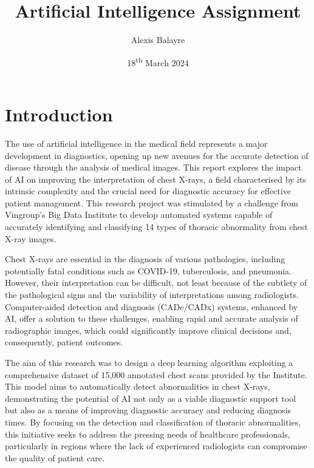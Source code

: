 \documentclass[12pt,oneside]{book} %
\title{Artificial Intelligence Assignment}
\author{Alexis Balayre}
\date{18\textsuperscript{th} March 2024}
\begin{document}
\frontmatter

\maketitle

{
    \clearpage
    \singlespacing
    {
        \tableofcontents
    }
    \clearpage

    \listoffigures

    \listoftables
}

\mainmatter
\pagestyle{fancy}
\fancyhead[L]{\nouppercase{\leftmark}}
\fancyhead[R]{\nouppercase{\rightmark}}

\chapter{Introduction}
The use of artificial intelligence in the medical field represents a major
development in diagnostics, opening up new avenues for the accurate detection
of disease through the analysis of medical images. This report explores the
impact of AI on improving the interpretation of chest X-rays, a field
characterised by its intrinsic complexity and the crucial need for diagnostic
accuracy for effective patient management. This research project was stimulated
by a challenge from Vingroup's Big Data Institute to develop automated systems
capable of accurately identifying and classifying 14 types of thoracic
abnormality from chest X-ray images.

Chest X-rays are essential in the diagnosis of various pathologies, including
potentially fatal conditions such as COVID-19, tuberculosis, and pneumonia.
However, their interpretation can be difficult, not least because of the
subtlety of the pathological signs and the variability of interpretations among
radiologists. Computer-aided detection and diagnosis (CADe/CADx) systems,
enhanced by AI, offer a solution to these challenges, enabling rapid and
accurate analysis of radiographic images, which could significantly improve
clinical decisions and, consequently, patient outcomes.

The aim of this research was to design a deep learning algorithm exploiting a
comprehensive dataset of 15,000 annotated chest scans provided by the
Institute. This model aims to automatically detect abnormalities in chest
X-rays, demonstrating the potential of AI not only as a viable diagnostic
support tool but also as a means of improving diagnostic accuracy and reducing
diagnosis times. By focusing on the detection and classification of thoracic
abnormalities, this initiative seeks to address the pressing needs of
healthcare professionals, particularly in regions where the lack of experienced
radiologists can compromise the quality of patient care.
\end{document}
